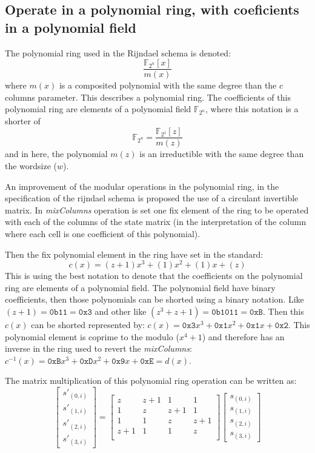 \documentclass[10pt,a4paper,twoside]{llncs}
\newcommand{\Fpn}[2]{\ensuremath{\mathbb{F}_{#1^#2}}}
\newcommand{\Fpnm}[2]{\ensuremath{\frac{\Fpn{2}{#1}[#2]}{m(#2)}}}
\begin{document}
\subsection{Operate in a polynomial ring, with coeficients in a polynomial field}\label{sec:polynomialRing}
The polynomial ring used in the Rijndael schema is denoted:
$$\Fpnm{n}{x}\label{eq:polynomialRing}$$
where $m(x)$ is a composited polynomial with the same degree than the $c$ columns parameter. This describes a polynomial ring. The coefficients of this polynomial ring are elements of a polynomial field $\Fpn{2}{n}$, where this notation is a shorter of
$$\Fpn{2}{n}=\Fpnm{1}{z}\label{eq:polynomialField}$$
and in here, the polynomial $m(z)$ is an irreductible with the same degree than the wordsize ($w$). 

An improvement of the modular operations in the polynomial ring, in the specification of the rijndael schema \cite{Daemen01aes-ammended} is proposed the use of a circulant invertible matrix. In \emph{mixColumns} operation is set one fix element of the ring to be operated with each of the columns of the state matrix (in the interpretation of the column where each cell is one coefficient of this polynomial).

Then the fix polynomial element in the ring have set in the standard:
$$c(x) = (z+1)x^3+(1)x^2+(1)x+(z)$$
This is using the best notation to denote that the coefficients on the polynomial ring are elements of a polynomial field. The polynomial field have binary coefficients, then those polynomials can be shorted using a binary notation. Like $(z+1)=\texttt{0b11}=\texttt{0x3}$ and other like $(z^3+z+1)=\texttt{0b1011}=\texttt{0xB}$. Then this $c(x)$ can be shorted represented by: $c(x) = \texttt{0x3}x^3+\texttt{0x1}x^2+\texttt{0x1}x+\texttt{0x2}$. This polynomial element is coprime to the modulo ($x^4+1$) and therefore has an inverse in the ring used to revert the \emph{mixColumns}: $c^{-1}(x) = \texttt{0xB}x^3+\texttt{0xD}x^2+\texttt{0x9}x+\texttt{0xE}=d(x)$.

The matrix multiplication of this polynomial ring operation can be written as:
\begin{equation}\label{eq:MDS}
  \begin{bmatrix}
    s'_{(0,i)}\\s'_{(1,i)}\\s'_{(2,i)}\\s'_{(3,i)}
  \end{bmatrix}
  =
  \begin{bmatrix}
    z & z+1 & 1 & 1 \\
    1 & z & z+1 & 1 \\
    1 & 1 & z & z+1 \\
    z+1 & 1 & 1 & z \\
  \end{bmatrix}
  \begin{bmatrix}
    s_{(0,i)}\\s_{(1,i)}\\s_{(2,i)}\\s_{(3,i)}
  \end{bmatrix}
\end{equation}
\end{document}
